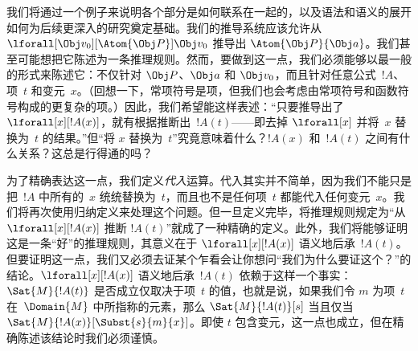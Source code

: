 \documentclass[../../../include/open-logic-section]{subfiles}
\begin{document}


我们将通过一个例子来说明各个部分是如何联系在一起的，以及语法和语义的展开如何为后续更深入的研究奠定基础。我们的推导系统应该允许从 $\lforall[\Obj
v_0][\Atom{\Obj P}]{\Obj v_0}$ 推导出 $\Atom{\Obj P}{\Obj a}$。我们甚至可能想把它陈述为一条推理规则。然而，要做到这一点，我们必须能够以最一般的形式来陈述它：不仅针对 $\Obj P$、$\Obj a$ 和 $\Obj v_0$，而且针对任意公式~$!A$、项~$t$ 和变元~$x$。（回想一下，常项符号是项，但我们也会考虑由常项符号和函数符号构成的更复杂的项。）因此，我们希望能这样表述：“只要推导出了 $\lforall[x][!A(x)]$，就有根据推断出~$!A(t)$——即去掉 $\lforall[x]$ 并将~$x$ 替换为~$t$ 的结果。”但“将 $x$ 替换为~$t$”究竟意味着什么？$!A(x)$ 和~$!A(t)$ 之间有什么关系？这总是行得通的吗？

为了精确表达这一点，我们定义\emph{代入}运算。代入其实并不简单，因为我们不能只是把~$!A$ 中所有的~$x$ 统统替换为~$t$，而且也不是任何项~$t$ 都能代入任何变元~$x$。我们将再次使用归纳定义来处理这个问题。但一旦定义完毕，将推理规则规定为“从 $\lforall[x][!A(x)]$ 推断 $!A(t)$”就成了一种精确的定义。此外，我们将能够证明这是一条“好”的推理规则，其意义在于 $\lforall[x][!A(x)]$ 语义地后承~$!A(t)$。但要证明这一点，我们又必须去证某个乍看会让你想问“我们为什么要证这个？”的结论。$\lforall[x][!A(x)]$ 语义地后承~$!A(t)$ 依赖于这样一个事实：$\Sat{M}{!A(t)}$ 是否成立仅取决于项~$t$ 的值，也就是说，如果我们令 $m$ 为项~$t$ 在~$\Domain{M}$ 中所指称的元素，那么 $\Sat{M}{!A(t)}[s]$ 当且仅当 $\Sat{M}{!A(x)}[\Subst{s}{m}{x}]$。即使 $t$ 包含变元，这一点也成立，但在精确陈述该结论时我们必须谨慎。
\end{document}
